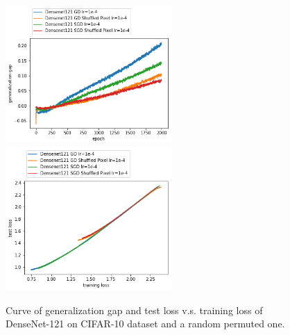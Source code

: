 \documentclass{article}
\theoremstyle{plain}
\theoremstyle{definition}
\newcommand{\norm}[1]{\left\lVert#1\right\rVert}
\begin{document}
\begin{figure}[H]
    \centering
    \includegraphics[width=2.5in]{gengap.png}
    \includegraphics[width=2.5in]{gentrain.png}
    \caption{Curve of generalization gap and test loss v.s. training loss of DenseNet-121 on CIFAR-10 dataset and a random permuted one.}
    \label{genperb}
\end{figure}

\end{document}
